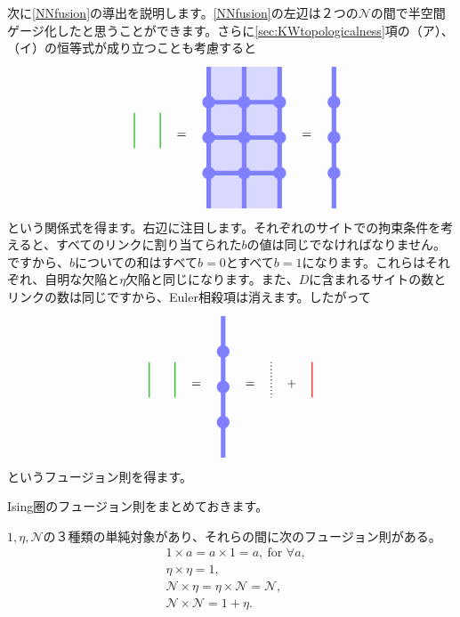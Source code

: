 \documentclass[report,paper=a4, fontsize=12pt, line_length=16cm, number_of_lines=33,dvipdfmx]{jlreq}
\numberwithin{equation}{chapter}
\newcommand{\Ncal}{\mathcal{N}}
\newcommand{\idline}{
  \quad \tikz[baseline=0.3cm]{
    \draw[thick,dotted](0,1)--(0,0);
   }\quad   
}
\newcommand{\etaline}{
  \quad \tikz[baseline=0.3cm]{
    \draw[thick,red](0,1)--(0,0);
   }\quad   
}
\newcommand{\KWline}{
  \quad \tikz[baseline=0.3cm]{
    \draw[thick,darkgreen](0,1)--(0,0);
   }\quad 
}
\begin{document}
次に\eqref{NNfusion}の導出を説明します。\eqref{NNfusion}の左辺は２つの$\Ncal$の間で半空間ゲージ化したと思うことができます。さらに\ref{sec:KWtopologicalness}項の（ア）、（イ）の恒等式が成り立つことも考慮すると
\begin{align}
  \KWline \KWline = \quad
  \begin{tikzpicture}[baseline=0cm]
    \foreach \x in {0,1}{
        \foreach \y in {-2,-1,...,1}{
        \fill[plaqblue](\x,\y) rectangle (\x+1,\y+1);
        }
    }
    \foreach \x in {0,1,2}{
        \foreach \y in {-1,0,1}{
            \fill[linkblue] (\x,\y) circle (1.8mm);
        }
    }
    \foreach \x in {0,1}{
        \foreach \y in {-1,0,1}{
            \draw[linkblue, line width = 1.3mm](\x,\y)--(\x + 1,\y);
        }
    }
    \foreach \x in {0,1,2}{
        \foreach \y in {-2,-1,...,1}{
            \draw[linkblue, line width = 1.3mm](\x,\y)--(\x,\y + 1);
        }
    }
\end{tikzpicture}
\quad
=
\quad
\begin{tikzpicture}[baseline=0cm]
    \foreach \x in {0}{
        \foreach \y in {-1,0,1}{
            \fill[linkblue] (\x,\y) circle (1.8mm);
        }
    }
    \foreach \x in {0}{
        \foreach \y in {-2,-1,...,1}{
            \draw[linkblue, line width = 1.3mm](\x,\y)--(\x,\y + 1);
        }
    }
\end{tikzpicture}
\end{align}
という関係式を得ます。右辺に注目します。それぞれのサイトでの拘束条件を考えると、すべてのリンクに割り当てられた$b$の値は同じでなければなりません。ですから、$b$についての和はすべて$b=0$とすべて$b=1$になります。これらはそれぞれ、自明な欠陥と$\eta$欠陥と同じになります。また、$D$に含まれるサイトの数とリンクの数は同じですから、Euler相殺項は消えます。したがって
\begin{align}
  \KWline \KWline
=
\quad
\begin{tikzpicture}[baseline=0cm]
    \foreach \x in {0}{
        \foreach \y in {-1,0,1}{
            \fill[linkblue] (\x,\y) circle (1.8mm);
        }
    }
    \foreach \x in {0}{
        \foreach \y in {-2,-1,...,1}{
            \draw[linkblue, line width = 1.3mm](\x,\y)--(\x,\y + 1);
        }
    }
\end{tikzpicture}
\quad = \idline + \etaline
\end{align}
というフュージョン則を得ます。

Ising圏のフュージョン則をまとめておきます。
\begin{emphasize}
  $1,\eta,\Ncal$の３種類の単純対象があり、それらの間に次のフュージョン則がある。
  \begin{align}
    &1\times a = a\times 1 = a,\ \text{for } \forall a,\\
    &\eta \times \eta =1,\\
    &\Ncal \times \eta =\eta \times \Ncal =\Ncal,\\
    &\Ncal \times \Ncal = 1 + \eta.
  \end{align}
\end{emphasize}
\end{document}
